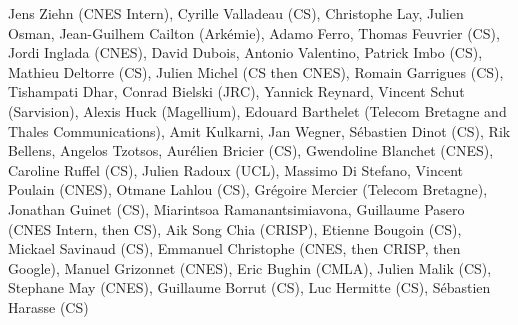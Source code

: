Jens Ziehn (CNES Intern), Cyrille Valladeau (CS), Christophe Lay, Julien Osman, Jean-Guilhem Cailton (Ark\'emie), Adamo Ferro, Thomas Feuvrier (CS), Jordi Inglada (CNES), David Dubois, Antonio Valentino, Patrick Imbo (CS), Mathieu Deltorre (CS), Julien Michel (CS then CNES), Romain Garrigues (CS), Tishampati Dhar, Conrad Bielski (JRC), Yannick Reynard, Vincent Schut (Sarvision), Alexis Huck (Magellium), Edouard Barthelet (Telecom Bretagne and Thales Communications), Amit Kulkarni, Jan Wegner, S\'ebastien Dinot (CS), Rik Bellens, Angelos Tzotsos, Aur\'elien Bricier (CS), Gwendoline Blanchet (CNES), Caroline Ruffel (CS), Julien Radoux (UCL), Massimo Di Stefano, Vincent Poulain (CNES), Otmane Lahlou (CS), Gr\'egoire Mercier (Telecom Bretagne), Jonathan Guinet (CS), Miarintsoa Ramanantsimiavona, Guillaume Pasero (CNES Intern, then CS), Aik Song Chia (CRISP), Etienne Bougoin (CS), Mickael Savinaud (CS), Emmanuel Christophe (CNES, then CRISP, then Google), Manuel Grizonnet (CNES), Eric Bughin (CMLA), Julien Malik (CS), Stephane May (CNES), Guillaume Borrut (CS), Luc Hermitte (CS), S\'ebastien Harasse (CS)